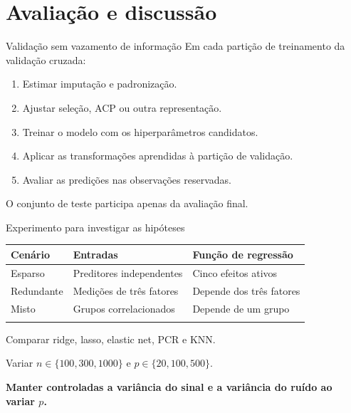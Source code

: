 \documentclass[
  10pt,
  ignorenonframetext,
  aspectratio=169,
  brazilian,
]{beamer}
\newcounter{none} %
\providecommand{\tightlist}{%
  \setlength{\itemsep}{0pt}\setlength{\parskip}{0pt}}
\begin{document}
\section{Avaliação e discussão}\label{avaliauxe7uxe3o-e-discussuxe3o}

\begin{frame}{Validação sem vazamento de informação}
\protect{}\label{validauxe7uxe3o-sem-vazamento-de-informauxe7uxe3o}
Em cada partição de treinamento da validação cruzada:

\begin{enumerate}
\tightlist
\item
  Estimar imputação e padronização.
\item
  Ajustar seleção, ACP ou outra representação.
\item
  Treinar o modelo com os hiperparâmetros candidatos.
\item
  Aplicar as transformações aprendidas à partição de validação.
\item
  Avaliar as predições nas observações reservadas.
\end{enumerate}

O conjunto de teste participa apenas da avaliação final.

\end{frame}

\begin{frame}{Experimento para investigar as hipóteses}
\protect{}\label{experimento-para-investigar-as-hipuxf3teses}
{\def\LTcaptype{none} %
\begin{longtable}[]{@{}lll@{}}
\toprule\noalign{}
Cenário & Entradas & Função de regressão \\
\midrule\noalign{}
\endhead
Esparso & Preditores independentes & Cinco efeitos ativos \\
Redundante & Medições de três fatores & Depende dos três fatores \\
Misto & Grupos correlacionados & Depende de um grupo \\
\bottomrule\noalign{}
\end{longtable}
}

Comparar ridge, lasso, elastic net, PCR e KNN.

Variar \(n\in\{100,300,1000\}\) e \(p\in\{20,100,500\}\).

\textbf{Manter controladas a variância do sinal e a variância do ruído
ao variar \(p\).}

\end{frame}
\end{document}
